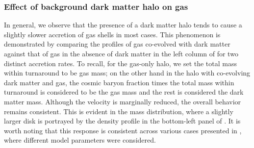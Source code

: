 \subsubsection{Effect of background dark matter halo on gas}
In general, we observe that the presence of a dark matter halo tends to cause a slightly slower accretion of gas shells in most cases. This phenomenon is demonstrated by comparing the profiles of gas co-evolved with dark matter against that of gas in the absence of dark matter in the left column of  for two distinct accretion rates. To recall, for the gas-only halo, we set the total mass within turnaround to be gas mass; on the other hand in the halo with co-evolving dark matter and gas, the cosmic baryon fraction times the total mass within turnaround is considered to be the gas mass and the rest is considered the dark matter mass. Although the velocity is marginally reduced, the overall behavior remains consistent. This is evident in the mass distribution, where a slightly larger disk is portrayed by the density profile in the bottom-left panel of . It is worth noting that this response is consistent across various cases presented in , where different model parameters were considered.
